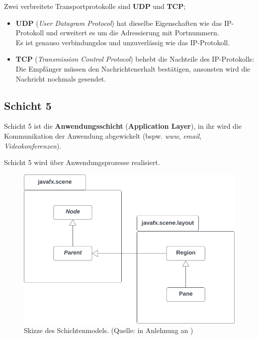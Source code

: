 \noindent
Zwei verbreitete Transportprotokolle sind \textbf{UDP} und \textbf{TCP};

\begin{itemize}
    \item \textbf{UDP} (\textit{User Datagram Protocol}) hat dieselbe Eigenschaften wie das IP-Protokoll und erweitert es um die Adressierung mit Portnummern.\\
    Es ist genauso verbindungslos und unzuverlässig wie das IP-Protokoll.
    \item \textbf{TCP} (\textit{Transmission Control Protocol}) behebt die Nachteile des IP-Protokolls: Die Empfänger müssen den Nachrichtenerhalt bestätigen, ansonsten wird die Nachricht nochmals gesendet.
\end{itemize}


\subsection*{Schicht 5}
Schicht 5 ist die \textbf{Anwendungsschicht} (\textbf{Application Layer}), in ihr wird die Kommunikation der Anwendung abgewickelt (bspw. \textit{www}, \textit{email}, \textit{Videokonferenzen}).


\begin{tcolorbox}
    Schicht 5 wird über Anwendungsprozesse realisiert.
\end{tcolorbox}


\begin{figure}
    \centering
    \includegraphics[scale=0.5]{chapters/fopt3/img/javafx/pane}
    \caption{Skizze des Schichtenmodels. (Quelle: in Anlehnung an \cite[257, Bild 5.2]{Oec22})}
    \label{fig:layers}
\end{figure}


